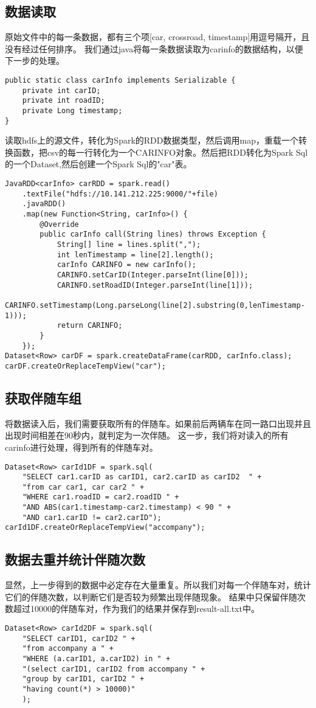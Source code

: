 \documentclass[CJK]{ctexart}
\begin{document}
\begin{multicols}{2}
\subsection{数据读取}
原始文件中的每一条数据，都有三个项[car, crossroad, timestamp]用逗号隔开，且没有经过任何排序。
我们通过java将每一条数据读取为carinfo的数据结构，以便下一步的处理。
\begin{lstlisting}
public static class carInfo implements Serializable {
    private int carID;
    private int roadID;
    private Long timestamp;
}
\end{lstlisting}
读取hdfs上的源文件，转化为Spark的RDD数据类型，然后调用map，重载一个转换函数，把csv的每一行转化为一个CARINFO对象。然后把RDD转化为Spark Sql的一个Dataset,然后创建一个Spark Sql的"car"表。
\begin{lstlisting}
JavaRDD<carInfo> carRDD = spark.read()
    .textFile("hdfs://10.141.212.225:9000/"+file)
    .javaRDD()
    .map(new Function<String, carInfo>() {
        @Override
        public carInfo call(String lines) throws Exception {
            String[] line = lines.split(",");
            int lenTimestamp = line[2].length();
            carInfo CARINFO = new carInfo();
            CARINFO.setCarID(Integer.parseInt(line[0]));
            CARINFO.setRoadID(Integer.parseInt(line[1]));
            CARINFO.setTimestamp(Long.parseLong(line[2].substring(0,lenTimestamp-1)));
            return CARINFO;
        }
    });
Dataset<Row> carDF = spark.createDataFrame(carRDD, carInfo.class);
carDF.createOrReplaceTempView("car");
\end{lstlisting}
\subsection{获取伴随车组}
将数据读入后，我们需要获取所有的伴随车。如果前后两辆车在同一路口出现并且出现时间相差在90秒内，就判定为一次伴随。
这一步，我们将对读入的所有carinfo进行处理，得到所有的伴随车对。
\begin{lstlisting}
Dataset<Row> carId1DF = spark.sql(
    "SELECT car1.carID as carID1, car2.carID as carID2  " +
    "from car car1, car car2 " +
    "WHERE car1.roadID = car2.roadID " +
    "AND ABS(car1.timestamp-car2.timestamp) < 90 " +
    "AND car1.carID != car2.carID");
carId1DF.createOrReplaceTempView("accompany");
\end{lstlisting}


\subsection{数据去重并统计伴随次数}
显然，上一步得到的数据中必定存在大量重复。所以我们对每一个伴随车对，统计它们的伴随次数，以判断它们是否较为频繁出现伴随现象。
结果中只保留伴随次数超过10000的伴随车对，作为我们的结果并保存到result-all.txt中。
\begin{lstlisting}
Dataset<Row> carId2DF = spark.sql(
    "SELECT carID1, carID2 " +
    "from accompany a " +
    "WHERE (a.carID1, a.carID2) in " +
    "(select carID1, carID2 from accompany " +
    "group by carID1, carID2 " +
    "having count(*) > 10000)"
    );
\end{lstlisting}



\end{multicols}
\end{document}

